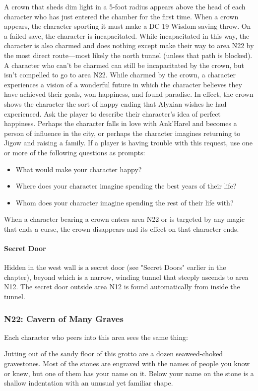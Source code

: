 \documentclass[10pt,a4,twoside,twocolumn,openany,nodeprecatedcode]{dndbook}
\begin{document}
A crown that sheds dim light in a 5-foot radius appears above the head of each character who has just entered the chamber for the first time. When a crown appears, the character sporting it must make a DC 19 Wisdom saving throw. On a failed save, the character is incapacitated. While incapacitated in this way, the character is also charmed and does nothing except make their way to area N22 by the most direct route—most likely the north tunnel (unless that path is blocked). A character who can't be charmed can still be incapacitated by the crown, but isn't compelled to go to area N22.
While charmed by the crown, a character experiences a vision of a wonderful future in which the character believes they have achieved their goals, won happiness, and found paradise. In effect, the crown shows the character the sort of happy ending that Alyxian wishes he had experienced. Ask the player to describe their character's idea of perfect happiness. Perhaps the character falls in love with Ank'Harel and becomes a person of influence in the city, or perhaps the character imagines returning to Jigow and raising a family. If a player is having trouble with this request, use one or more of the following questions as prompts:
\begin{itemize}

\item What would make your character happy?
\item Where does your character imagine spending the best years of their life?
\item Whom does your character imagine spending the rest of their life with?
\end{itemize}


When a character bearing a crown enters area N22 or is targeted by any magic that ends a curse, the crown disappears and its effect on that character ends.
\paragraph{Secret Door}
Hidden in the west wall is a secret door (see "Secret Doors" earlier in the chapter), beyond which is a narrow, winding tunnel that steeply ascends to area N12. The secret door outside area N12 is found automatically from inside the tunnel.
\subsubsection{N22: Cavern of Many Graves}
Each character who peers into this area sees the same thing:
\begin{DndReadAloud}{}
Jutting out of the sandy floor of this grotto are a dozen seaweed-choked gravestones. Most of the stones are engraved with the names of people you know or knew, but one of them has your name on it. Below your name on the stone is a shallow indentation with an unusual yet familiar shape.
\end{DndReadAloud}
\end{document}
